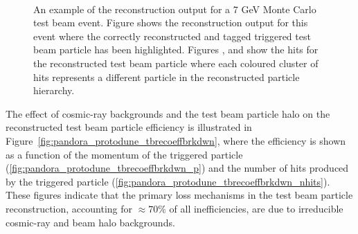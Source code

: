 \begin{figure}[!ht]%
\centering
{} \\ 
\caption[Pandora reconstruction output for \SI{7}{GeV} MC test beam event]{An example of the  reconstruction output for a 7 GeV Monte Carlo test beam event.  Figure \protect{} shows the \threed reconstruction output for this event where the correctly reconstructed and tagged triggered test beam particle has been highlighted.  Figures \protect{}, \protect{} and \protect{} show the \twod hits for the reconstructed test beam particle where each coloured cluster of hits represents a different particle in the reconstructed particle hierarchy.}
\label{pandora_protodune_reco} 
\end{figure}

The effect of cosmic-ray backgrounds and the test beam particle halo on the reconstructed test beam particle efficiency is illustrated in Figure~\ref{fig:pandora_protodune_tbrecoeffbrkdwn}, where the efficiency is shown as a function of the momentum of the triggered particle (\ref{fig:pandora_protodune_tbrecoeffbrkdwn_p}) and the number of hits produced by the triggered particle (\ref{fig:pandora_protodune_tbrecoeffbrkdwn_nhits}).  These figures indicate that the primary loss mechanisms in the test beam particle reconstruction, accounting for $\approx 70\%$ of all inefficiencies, are due to irreducible cosmic-ray and  beam halo backgrounds.



